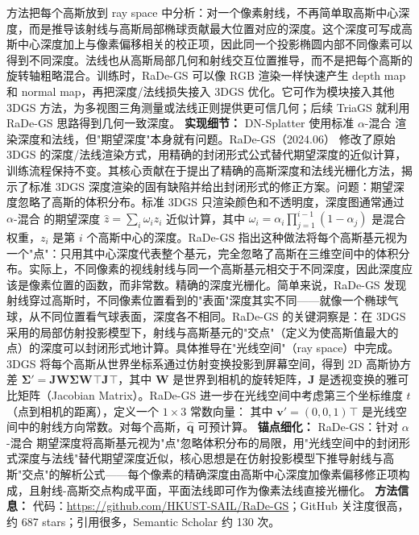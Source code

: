 方法把每个高斯放到 ray space 中分析：对一个像素射线，不再简单取高斯中心深度，而是推导该射线与高斯局部椭球贡献最大位置对应的深度。这个深度可写成高斯中心深度加上与像素偏移相关的校正项，因此同一个投影椭圆内部不同像素可以得到不同深度。法线也从高斯局部几何和射线交互位置推导，而不是把每个高斯的旋转轴粗略混合。训练时，RaDe-GS 可以像 RGB 渲染一样快速产生 depth map 和 normal map，再把深度/法线损失接入 3DGS 优化。它可作为模块接入其他 3DGS 方法，为多视图三角测量或法线正则提供更可信几何；后续 TriaGS 就利用 RaDe-GS 思路得到几何一致深度。
\textbf{实现细节：} DN-Splatter 使用标准 $\alpha$-混合 渲染深度和法线，但"期望深度"本身就有问题。RaDe-GS（2024.06） 修改了原始 3DGS 的深度/法线渲染方式，用精确的封闭形式公式替代期望深度的近似计算，训练流程保持不变。其核心贡献在于提出了精确的高斯深度和法线光栅化方法，揭示了标准 3DGS 深度渲染的固有缺陷并给出封闭形式的修正方案。问题：期望深度忽略了高斯的体积分布。标准 3DGS 只渲染颜色和不透明度，深度图通常通过 $\alpha$-混合 的期望深度 $\hat{z} = \sum_i \omega_i z_i$ 近似计算，其中 $\omega_i = \alpha_i \prod_{j=1}^{i-1}(1-\alpha_j)$ 是混合权重，$z_i$ 是第 $i$ 个高斯中心的深度。RaDe-GS 指出这种做法将每个高斯基元视为一个"点"：只用其中心深度代表整个基元，完全忽略了高斯在三维空间中的体积分布。实际上，不同像素的视线射线与同一个高斯基元相交于不同深度，因此深度应该是像素位置的函数，而非常数。精确的深度光栅化。简单来说，RaDe-GS 发现射线穿过高斯时，不同像素位置看到的"表面"深度其实不同——就像一个椭球气球，从不同位置看气球表面，深度各不相同。RaDe-GS 的关键洞察是：在 3DGS 采用的局部仿射投影模型下，射线与高斯基元的"交点"（定义为使高斯值最大的点）的深度可以封闭形式地计算。具体推导在"光线空间"（ray space）中完成。3DGS 将每个高斯从世界坐标系通过仿射变换投影到屏幕空间，得到 2D 高斯协方差 $\boldsymbol{\Sigma}' = \mathbf{J}\mathbf{W}\boldsymbol{\Sigma}\mathbf{W}^{}\top\mathbf{J}^{}\top$，其中 $\mathbf{W}$ 是世界到相机的旋转矩阵，$\mathbf{J}$ 是透视变换的雅可比矩阵（Jacobian Matrix）。RaDe-GS 进一步在光线空间中考虑第三个坐标维度 $t$（点到相机的距离），定义一个 $1\times 3$ 常数向量： 其中 $\mathbf{v}'=(0,0,1)^{}\top$ 是光线空间中的射线方向常数。对每个高斯，$\hat{\mathbf{q}}$ 可预计算。
\textbf{锚点细化：} RaDe-GS：针对 $\alpha$-混合 期望深度将高斯基元视为"点"忽略体积分布的局限，用"光线空间中的封闭形式深度与法线"替代期望深度近似，核心思想是在仿射投影模型下推导射线与高斯"交点"的解析公式——每个像素的精确深度由高斯中心深度加像素偏移修正项构成，且射线-高斯交点构成平面，平面法线即可作为像素法线直接光栅化。
\textbf{方法信息：} 代码：\url{https://github.com/HKUST-SAIL/RaDe-GS}；GitHub 关注度很高，约 687 stars；引用很多，Semantic Scholar 约 130 次。



